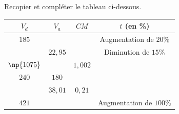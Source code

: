 \begin{exo}{}
	Recopier et compléter le tableau ci-dessous.


	\begin{center}
		\def\arraystretch{1.5}
		\begin{tabular}{|c|c|c|c|} \hline
			\rowcolor{gray!30}$V_d$ & $V_a$   & $CM$    & $t$ (en \%)             \\ \hline
			$185$                   &         &         & Augmentation de $20\%$  \\ \hline
			                        & $22,95$ &         & Diminution de $15\%$    \\ \hline
			$\np{1075}$             &         & $1,002$ &                         \\ \hline
			$240$                   & $180$   &         &                         \\ \hline
			                        & $38,01$ & $0,21$  &                         \\ \hline
			$421$                   &         &         & Augmentation de $100\%$ \\ \hline
		\end{tabular}
	\end{center}
\end{exo}
